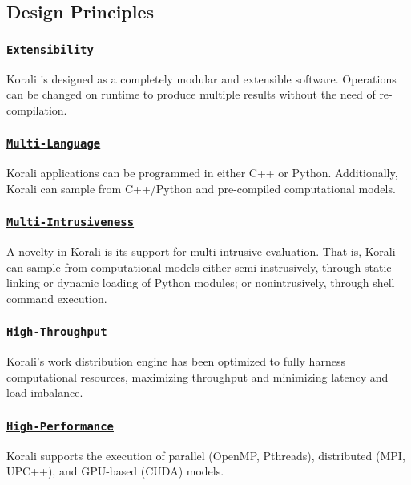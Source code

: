 \subsection*{Design Principles}

\subsubsection*{\href{usage/basics}{\tt Extensibility}}

Korali is designed as a completely modular and extensible software. Operations can be changed on runtime to produce multiple results without the need of re-\/compilation.

\subsubsection*{\href{usage/basics}{\tt Multi-\/\-Language}}

Korali applications can be programmed in either C++ or Python. Additionally, Korali can sample from C++/\-Python and pre-\/compiled computational models.

\subsubsection*{\href{usage/config/#evaluation-conduit}{\tt Multi-\/\-Intrusiveness}}

A novelty in Korali is its support for multi-\/intrusive evaluation. That is, Korali can sample from computational models either semi-\/instrusively, through static linking or dynamic loading of Python modules; or nonintrusively, through shell command execution.

\subsubsection*{\href{tutorials/mpi/mpi.md}{\tt High-\/\-Throughput}}

Korali's work distribution engine has been optimized to fully harness computational resources, maximizing throughput and minimizing latency and load imbalance.

\subsubsection*{\href{tutorials/mpi/mpi.md}{\tt High-\/\-Performance}}

Korali supports the execution of parallel (Open\-M\-P, Pthreads), distributed (M\-P\-I, U\-P\-C++), and G\-P\-U-\/based (C\-U\-D\-A) models. 